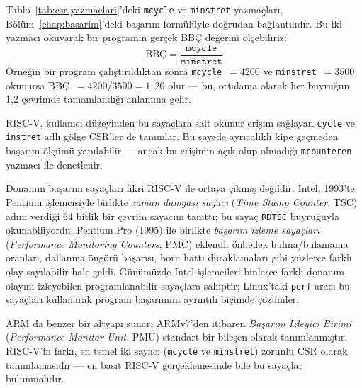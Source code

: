 \begin{bilginot}
Tablo~\ref{tab:csr-yazmaclari}'deki \texttt{mcycle} ve \texttt{minstret} yazmaçları, Bölüm~\ref{chap:basarim}'deki başarım formülüyle doğrudan bağlantılıdır. Bu iki yazmacı okuyarak bir programın gerçek BBÇ değerini ölçebiliriz:
\[
\text{BBÇ} = \frac{\texttt{mcycle}}{\texttt{minstret}}
\]
Örneğin bir program çalıştırıldıktan sonra \texttt{mcycle}~$= 4200$ ve \texttt{minstret}~$= 3500$ okunursa BBÇ~$= 4200 / 3500 = 1{,}20$ olur --- bu, ortalama olarak her buyruğun 1,2 çevrimde tamamlandığı anlamına gelir.

RISC-V, kullanıcı düzeyinden bu sayaçlara salt okunur erişim sağlayan \texttt{cycle} ve \texttt{instret} adlı gölge CSR'ler de tanımlar. Bu sayede ayrıcalıklı kipe geçmeden başarım ölçümü yapılabilir --- ancak bu erişimin açık olup olmadığı \texttt{mcounteren} yazmacı ile denetlenir.

Donanım başarım sayaçları fikri RISC-V ile ortaya çıkmış değildir. Intel, 1993'te Pentium işlemcisiyle birlikte \emph{zaman damgası sayacı} (\emph{Time Stamp Counter}, TSC) adını verdiği 64 bitlik bir çevrim sayacını tanıttı; bu sayaç \texttt{RDTSC} buyruğuyla okunabiliyordu. Pentium Pro (1995) ile birlikte \emph{başarım izleme sayaçları} (\emph{Performance Monitoring Counters}, PMC) eklendi: önbellek bulma/bulamama oranları, dallanma öngörü başarısı, boru hattı duraklamaları gibi yüzlerce farklı olay sayılabilir hale geldi. Günümüzde Intel işlemcileri binlerce farklı donanım olayını izleyebilen programlanabilir sayaçlara sahiptir; Linux'taki \texttt{perf} aracı bu sayaçları kullanarak program başarımını ayrıntılı biçimde çözümler.

ARM da benzer bir altyapı sunar: ARMv7'den itibaren \emph{Başarım İzleyici Birimi} (\emph{Performance Monitor Unit}, PMU) standart bir bileşen olarak tanımlanmıştır. RISC-V'in farkı, en temel iki sayacı (\texttt{mcycle} ve \texttt{minstret}) zorunlu CSR olarak tanımlamasıdır --- en basit RISC-V gerçeklemesinde bile bu sayaçlar bulunmalıdır.
\end{bilginot}

